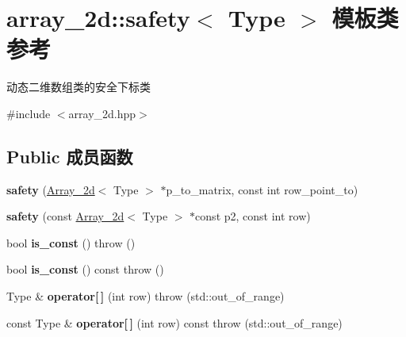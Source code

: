 \hypertarget{classarray__2d_1_1safety}{}\section{array\+\_\+2d\+:\+:safety$<$ Type $>$ 模板类 参考}
\label{classarray__2d_1_1safety}


动态二维数组类的安全下标类  




{\ttfamily \#include $<$array\+\_\+2d.\+hpp$>$}

\subsection*{Public 成员函数}
\begin{DoxyCompactItemize}
\item 
\mbox{\label{classarray__2d_1_1safety_a4914000db358a170ae5c33ece147f75f}} 
{\bfseries safety} (\hyperlink{classarray__2d_1_1_array__2d}{Array\+\_\+2d}$<$ Type $>$ $\ast$p\+\_\+to\+\_\+matrix, const int row\+\_\+point\+\_\+to)
\item 
\mbox{\label{classarray__2d_1_1safety_ab346a0f8c8007b3edb58172a6e090ef6}} 
{\bfseries safety} (const \hyperlink{classarray__2d_1_1_array__2d}{Array\+\_\+2d}$<$ Type $>$ $\ast$const p2, const int row)
\item 
\mbox{\label{classarray__2d_1_1safety_a91ff9dc58dd512fb8c7dba7c9f092fc9}} 
bool {\bfseries is\+\_\+const} ()  throw ()
\item 
\mbox{\label{classarray__2d_1_1safety_a9b89f0ad51d646134d6df0cbf9c80f03}} 
bool {\bfseries is\+\_\+const} () const  throw ()
\item 
\mbox{\label{classarray__2d_1_1safety_a38e861e6933b9703929695dc2efbfabc}} 
Type \& {\bfseries operator\mbox{[}$\,$\mbox{]}} (int row)  throw (std\+::out\+\_\+of\+\_\+range)
\item 
\mbox{\label{classarray__2d_1_1safety_a0848dc10b3989d6b7522c4e22c84e6f5}} 
const Type \& {\bfseries operator\mbox{[}$\,$\mbox{]}} (int row) const  throw (std\+::out\+\_\+of\+\_\+range)

\end{DoxyCompactItemize}
